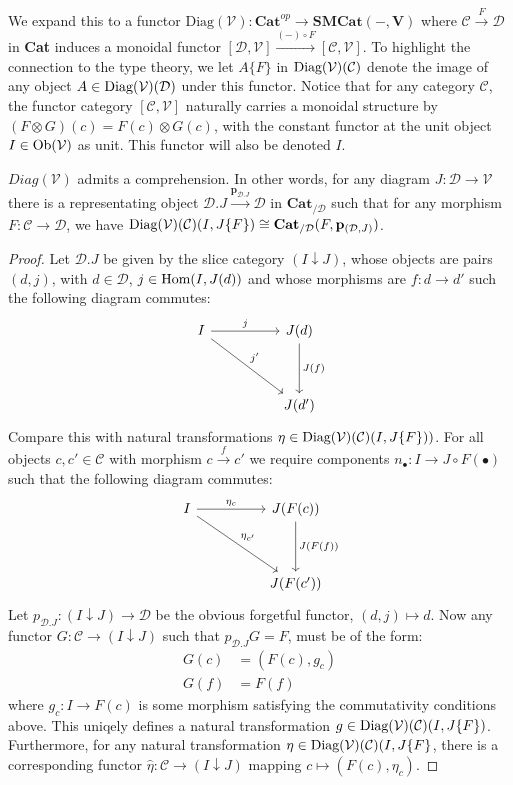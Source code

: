 \newpage
We expand this to a functor $\text{Diag}(\mathcal{V}) : \mathbf{Cat}^{op} \to \mathbf{SMCat(-,V)}$ where $\mathcal{C} \xrightarrow{F} \mathcal{D}$ in \textbf{Cat} induces a monoidal functor $[\mathcal{D}, \mathcal{V}] \xrightarrow{(-) \circ F} [\mathcal{C}, \mathcal{V}]$. To highlight the connection to the type theory, we let $A\{F\}$ in  $\operatorname{\text{Diag}}(\mathcal{V})(\mathcal{C})$ denote the image of any object $A \in \operatorname{\text{Diag}}(\mathcal{V})(\mathcal{D})$ under this functor. Notice that for any category $\mathcal{C}$, the functor category $[\mathcal{C}, \mathcal{V}]$ naturally carries a monoidal structure by $(F \otimes G)(c) = F(c) \otimes G(c)$, with the constant functor at the unit object $I \in \mathcal{\operatorname{\text{Ob}}(V)}$ as unit. This functor will also be denoted $I$.
\begin{thm}
$Diag(\mathcal{V})$ admits a comprehension. In other words, for any diagram $J : \mathcal{D} \to \mathcal{V}$ there is a representating object $\mathcal{D}.J \xrightarrow{\mathbf{p}_{\mathcal{D}.J}} \mathcal{D}$ in $\mathbf{Cat}_{/\mathcal{D}}$ such that for any morphism $F : \mathcal{C} \to \mathcal{D}$, we have $\operatorname{\text{Diag}}(\mathcal{V})(\mathcal{C})(I, J\{F\}) \cong \mathbf{Cat}_{/\mathcal{D}}(F, \mathbf{p}_{(\mathcal{D}, J)})$.
\begin{proof}
Let $\mathcal{D}.J$ be given by the slice category $(I \downarrow J)$, whose objects are pairs $(d, j)$, with $d \in \mathcal{D}$, $j \in \operatorname{\text{Hom}}(I,J(d))$ and whose morphisms are $f : d \to d'$ such the following diagram commutes:
\[
\ti
I \ar[r, "j"] \ar[rd, "j'"] & J(d) \ar[d,"J(f)"]\\
& J(d')
\kz
\]
Compare this with natural transformations $\eta \in \operatorname{\text{Diag}}(\mathcal{V})(\mathcal{C})(I, J\{F\}))$. For all objects $c, c' \in \mathcal{C}$ with morphism $c \xrightarrow{f} c'$ we require components $n_{\bullet} : I \to J \circ F(\bullet)$ such that the following diagram commutes:
\[
\ti
I \ar[r, "\eta_c"] \ar[rd, "\eta_{c'}"] & J(F(c)) \ar[d,"J(F(f))"]\\
& J(F(c'))
\kz
\]
Let $p_{\mathcal{D}.J} : (I \downarrow J) \to \mathcal{D}$ be the obvious forgetful functor, $(d, j) \mapsto d$. Now any functor $G : \mathcal{C} \to (I \downarrow J)$ such that $p_{\mathcal{D}.J}G = F$, must be of the form:
\[
\begin{split}
G(c) &= (F(c), g_c)\\
G(f) &= F(f)
\end{split}
\]
where $g_c : I \to F(c)$ is some morphism satisfying the commutativity conditions above. This uniqely defines a natural transformation $g \in \operatorname{\text{Diag}}(\mathcal{V})(\mathcal{C})(I, J\{F\})$. Furthermore, for any natural transformation $\eta \in \operatorname{\text{Diag}}(\mathcal{V})(\mathcal{C})(I, J\{F\}$, there is a corresponding functor $\hat \eta : \mathcal{C} \to (I \downarrow J)$ mapping $c \mapsto (F(c), \eta_c)$.

\end{proof}
\end{thm}
